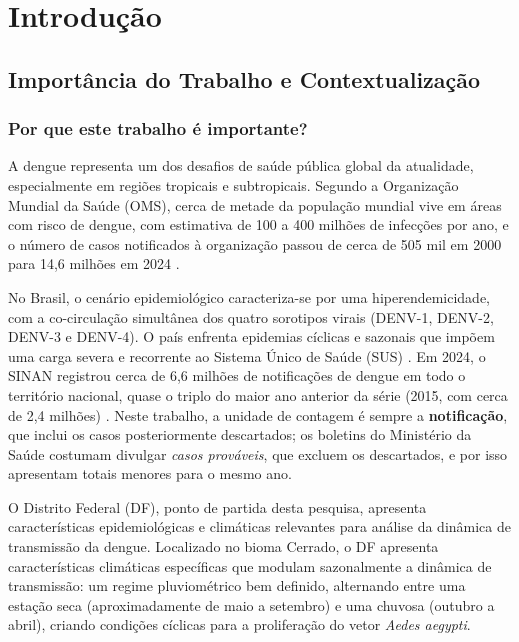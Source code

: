 \chapter[Introdução]{Introdução}
\label{cap:introducao}

\section{Importância do Trabalho e Contextualização}

\subsection{Por que este trabalho é importante?}

A dengue representa um dos desafios de saúde pública global da atualidade, especialmente em regiões tropicais e subtropicais. Segundo a Organização Mundial da Saúde (OMS), cerca de metade da população mundial vive em áreas com risco de dengue, com estimativa de 100 a 400 milhões de infecções por ano, e o número de casos notificados à organização passou de cerca de 505 mil em 2000 para 14,6 milhões em 2024 \cite{who2025dengue}.

No Brasil, o cenário epidemiológico caracteriza-se por uma hiperendemicidade, com a co-circulação simultânea dos quatro sorotipos virais (DENV-1, DENV-2, DENV-3 e DENV-4). O país enfrenta epidemias cíclicas e sazonais que impõem uma carga severa e recorrente ao Sistema Único de Saúde (SUS) \cite{mussumeci2020large, roster2022machine}. Em 2024, o SINAN registrou cerca de 6,6 milhões de notificações de dengue em todo o território nacional, quase o triplo do maior ano anterior da série (2015, com cerca de 2,4 milhões) \cite{sinan2025}. Neste trabalho, a unidade de contagem é sempre a \textbf{notificação}, que inclui os casos posteriormente descartados; os boletins do Ministério da Saúde costumam divulgar \textit{casos prováveis}, que excluem os descartados, e por isso apresentam totais menores para o mesmo ano.

O Distrito Federal (DF), ponto de partida desta pesquisa, apresenta características epidemiológicas e climáticas relevantes para análise da dinâmica de transmissão da dengue. Localizado no bioma Cerrado, o DF apresenta características climáticas específicas que modulam sazonalmente a dinâmica de transmissão: um regime pluviométrico bem definido, alternando entre uma estação seca (aproximadamente de maio a setembro) e uma chuvosa (outubro a abril), criando condições cíclicas para a proliferação do vetor \textit{Aedes aegypti}.

